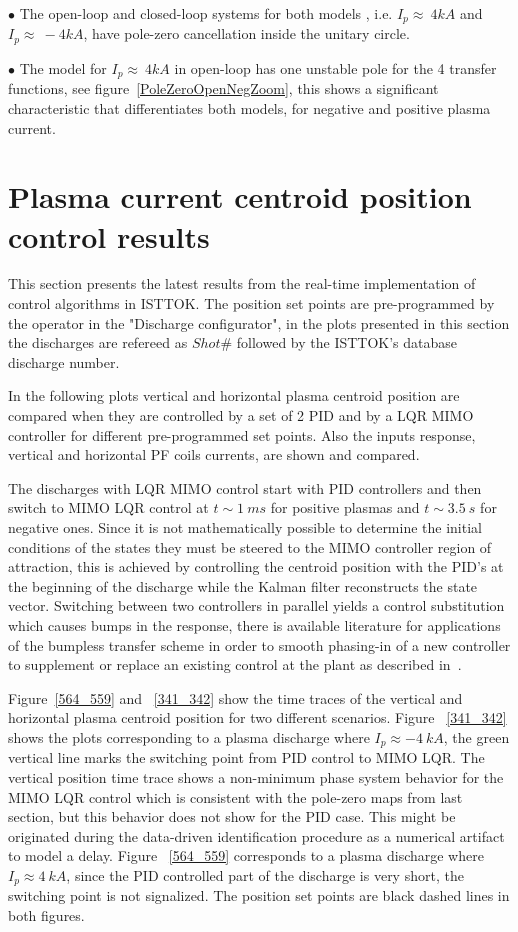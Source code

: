 $\bullet$  The open-loop and closed-loop systems for both models , i.e. $I_p\approx~4kA$ and $I_p\approx~-4kA$, have pole-zero cancellation inside the unitary circle.
\smallskip

$\bullet$  The model for $I_p\approx~4kA$ in open-loop has one unstable pole for the 4 transfer functions, see figure~\ref{PoleZeroOpenNegZoom}, this  shows a significant characteristic that differentiates both models, for negative and positive plasma current.\smallskip

\section{Plasma current centroid position control results}

This section presents the latest results from the real-time implementation of control algorithms in ISTTOK. The position set points are pre-programmed by the operator in the "Discharge configurator", in the plots presented in this section the discharges are refereed as $Shot \#$ followed by the ISTTOK's database discharge number.\smallskip

In the following plots vertical and horizontal plasma centroid position are compared when they are controlled by a set of 2 PID and by a LQR MIMO controller for different pre-programmed set points. Also the inputs response, vertical and horizontal PF coils currents, are shown and compared.\smallskip

The discharges with  LQR MIMO control start with PID controllers and then switch to  MIMO LQR control at $t\sim 1~ms$ for positive plasmas and  $t\sim 3.5~s$ for negative ones. Since it is not mathematically possible to determine the initial conditions of the states they must be steered to the MIMO controller region of attraction, this is achieved by controlling the centroid position with the PID's  at the beginning of the discharge while the Kalman filter reconstructs the state vector. Switching between two controllers in parallel yields a control substitution which causes bumps in the response, there is available literature  for applications of the bumpless transfer scheme in order to smooth phasing-in of a new controller to supplement or replace an existing control at the plant as described in~\cite{Bendtsen2005}. \smallskip


Figure~\ref{564_559} and  ~\ref{341_342} show the time traces of the vertical and horizontal plasma centroid position for two different scenarios. Figure ~\ref{341_342} shows the plots corresponding to a plasma discharge where $I_p\approx -4~kA$, the green vertical line marks the switching point from PID control to MIMO LQR. The vertical position time trace shows a non-minimum phase system behavior for the MIMO LQR control which is consistent with the pole-zero maps from last section,  but this behavior does not show for the PID case. This might be originated during the data-driven identification procedure as a numerical artifact to model a delay. Figure ~\ref{564_559} corresponds to a plasma discharge where $I_p\approx 4~kA$, since the  PID controlled part of the discharge is very short, the switching point is not signalized. The position set points are black dashed lines in both figures.\smallskip


